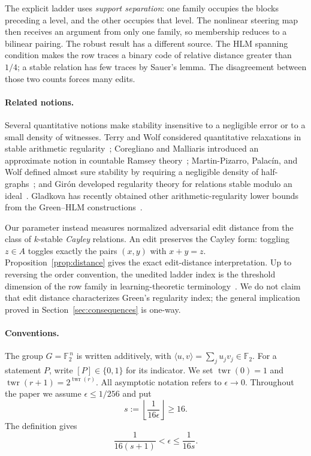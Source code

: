 \documentclass[10pt,a4paper]{amsart}
\numberwithin{theorem}{section}
\newcommand{\F}{\mathbb{F}}
\newcommand{\inner}[2]{\langle #1,#2\rangle}
\newcommand{\twr}{\operatorname{twr}}
\begin{document}
The explicit ladder uses \emph{support separation}: one family occupies the
blocks preceding a level, and the other occupies that level.  The nonlinear
steering map then receives an argument from only one family, so membership
reduces to a bilinear pairing.  The robust result has a different source.
The HLM spanning condition makes the row traces a binary code of relative
distance greater than $1/4$; a stable relation has few traces by Sauer's
lemma.  The disagreement between those two counts forces many edits.

\paragraph{Related notions.}
Several quantitative notions make stability insensitive to a negligible
error or to a small density of witnesses.  Terry and Wolf considered
quantitative relaxations in stable arithmetic regularity~\cite[\S5]{TW};
Coregliano and Malliaris introduced an approximate notion in countable
Ramsey theory~\cite[Definition~3.5]{CM}; Martin-Pizarro, Palac\'in, and Wolf
defined almost sure stability by requiring a negligible density of
half-graphs~\cite{MPPW}; and Gir\'on developed regularity theory for
relations stable modulo an ideal~\cite{Giron}.  Gladkova has recently
obtained other arithmetic-regularity lower bounds from the Green--HLM
constructions~\cite{Gladkova}.

Our parameter instead measures normalized adversarial edit distance from
the class of $k$-stable \emph{Cayley} relations.  An edit preserves the
Cayley form: toggling $z\in A$ toggles exactly the pairs $(x,y)$ with
$x+y=z$.  Proposition~\ref{prop:distance} gives the exact edit-distance
interpretation.  Up to reversing the order convention, the unedited
ladder index is the threshold dimension of the row family in
learning-theoretic terminology~\cite{GGKM}.  We do not claim that edit
distance characterizes Green's regularity index; the general implication
proved in Section~\ref{sec:consequences} is one-way.

\paragraph{Conventions.}
The group $G=\F_2^{\,n}$ is written additively, with
$\inner{u}{v}=\sum_j u_jv_j\in\F_2$.  For a statement $P$, write
$[P]\in\{0,1\}$ for its indicator.  We set $\twr(0)=1$ and
$\twr(r+1)=2^{\twr(r)}$.  All asymptotic notation refers to
$\epsilon\to0$.  Throughout the paper we assume $\epsilon\le1/256$ and put
\[
  s:=\left\lfloor\frac1{16\epsilon}\right\rfloor\ge16.
\]
The definition gives
\begin{equation}\label{eq:epsilon-s}
  \frac1{16(s+1)}<\epsilon\le\frac1{16s}.
\end{equation}
\end{document}

